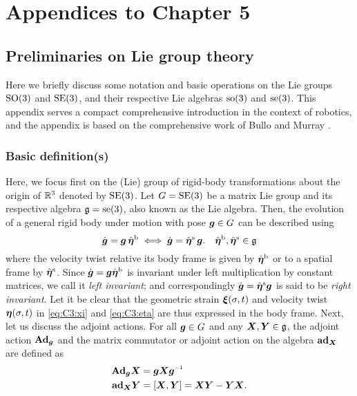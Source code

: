 \chapter{Appendices to Chapter 5}
\vspace{-5mm}
\section{Preliminaries on Lie group theory} 
\label{app:C3:liegroup}
Here we briefly discuss some notation and basic operations on the Lie groups $\textup{\textrm{SO}}(3)$ and $\textup{\textrm{SE}}(3)$, and their respective Lie algebras $\textup{\textrm{so}}(3)$ and $\textup{\textrm{se}}(3)$. This appendix serves a compact comprehensive introduction in the context of robotics, and the appendix is based on the comprehensive work of Bullo and Murray \cite{Bullo1995}.

\subsection{Basic definition(s)}
Here, we focus first on the (Lie) group of rigid-body transformations about the origin of $\mathbb{R}^3$ denoted by $\textup{\textrm{SE}}(3)$. Let $G = \textup{\textrm{SE}}(3)$ be a matrix Lie group and its respective algebra $\mathfrak{g} = \textup{\textrm{se}}(3)$, also known as the Lie algebra. Then, the evolution of a general rigid body under motion with pose ${\boldsymbol{g}} \in G$ can be described using 
%
\begin{equation}
\dot{{\boldsymbol{g}}} = {\boldsymbol{g}}\, \hat{{\boldsymbol{\eta}}}^{\textrm{b}} \;  \Longleftrightarrow  \; \dot{{\boldsymbol{g}}} = \hat{{\boldsymbol{\eta}}}^{\textrm{s}}\,{\boldsymbol{g}}. \quad \hat{{\boldsymbol{\eta}}}^{\textrm{b}},\hat{{\boldsymbol{\eta}}}^{\textrm{s}} \in \mathfrak{g}
\end{equation}
%
where the velocity twist relative its body frame is given by $\hat{{\boldsymbol{\eta}}}^\textrm{b}$ or to a spatial frame by $\hat{{\boldsymbol{\eta}}}^\textrm{s}$. Since $\dot{{\boldsymbol{g}}} = {\boldsymbol{g}} \hat{{\boldsymbol{\eta}}}^{\textrm{b}}$ is invariant under left multiplication by constant matrices, we call it \textit{left invariant}; and correspondingly $\dot{{\boldsymbol{g}}} = \hat{{\boldsymbol{\eta}}}^{\textrm{s}} {\boldsymbol{g}} $ is said to be \textit{right invariant}. Let it be clear that the geometric strain ${\boldsymbol{\xi}}(\sigma,t)$ and velocity twist ${\boldsymbol{\eta}}(\sigma,t)$ in \eqref{eq:C3:xi} and \eqref{eq:C3:eta} are thus expressed in the body frame. Next, let us discuss the adjoint actions. For all ${\boldsymbol{g}} \in G$ and any ${\boldsymbol{X}},{\boldsymbol{Y}} \in \mathfrak{g}$, the adjoint action $\textbf{Ad}_{{\boldsymbol{g}}}$ and the matrix commutator or adjoint action on the algebra $\textbf{ad}_{{\boldsymbol{X}}}$ are defined as 
%
\begin{align}
\Ad_{\gB} \XB & = \gB \XB \gB \inv \label{eq:C3:A1:adjoint1}\\
\ad_{\XB} \YB & = \left[\XB,\YB\right]  = \XB \YB - \YB\XB. \label{eq:C3:A1:adjoint2}
\end{align}
